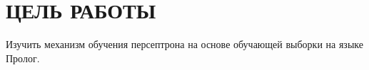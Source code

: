 \section{ЦЕЛЬ РАБОТЫ}

Изучить механизм обучения персептрона на основе обучающей выборки на языке Пролог.